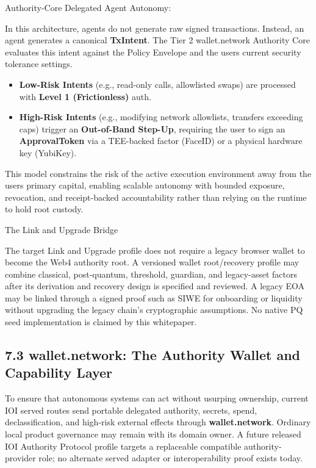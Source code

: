 \documentclass[
  11pt,
]{article}
\providecommand{\tightlist}{%
  \setlength{\itemsep}{0pt}\setlength{\parskip}{0pt}}
\begin{document}
Authority-Core Delegated Agent Autonomy:

In this architecture, agents do not generate raw signed transactions.
Instead, an agent generates a canonical \textbf{TxIntent}. The Tier 2
wallet.network Authority Core evaluates this intent against the Policy Envelope and the
user\textquotesingle s current security tolerance settings.

\begin{itemize}
\tightlist
\item
  \textbf{Low-Risk Intents} (e.g., read-only calls, allowlisted swaps)
  are processed with \textbf{Level 1 (Frictionless)} auth.
\item
  \textbf{High-Risk Intents} (e.g., modifying network allowlists,
  transfers exceeding caps) trigger an \textbf{Out-of-Band Step-Up},
  requiring the user to sign an \textbf{ApprovalToken} via a TEE-backed
  factor (FaceID) or a physical hardware key (YubiKey).
\end{itemize}

This model constrains the risk of the active execution environment away
from the user\textquotesingle s primary capital, enabling scalable
autonomy with bounded exposure, revocation, and receipt-backed
accountability rather than relying on the runtime to hold root custody.

The Link and Upgrade Bridge

The target Link and Upgrade profile does not require a legacy browser wallet
to become the Web4 authority root. A versioned wallet root/recovery profile may
combine classical, post-quantum, threshold, guardian, and legacy-asset factors
after its derivation and recovery design is specified and reviewed. A legacy
EOA may be linked through a signed proof such as SIWE for onboarding or
liquidity without upgrading the legacy chain's cryptographic assumptions. No
native PQ seed implementation is claimed by this whitepaper.

\hypertarget{wallet.network-the-authority-wallet-and-capability-layer}{%
\subsection{7.3 wallet.network: The Authority Wallet and Capability
Layer}\label{wallet.network-the-authority-wallet-and-capability-layer}}

To ensure that autonomous systems can act without usurping ownership,
current IOI served routes send portable delegated authority, secrets, spend,
declassification, and high-risk external effects through
\textbf{wallet.network}. Ordinary local product governance may remain with its
domain owner. A future released IOI Authority Protocol profile targets a
replaceable compatible authority-provider role; no alternate served adapter or
interoperability proof exists today.
\end{document}
